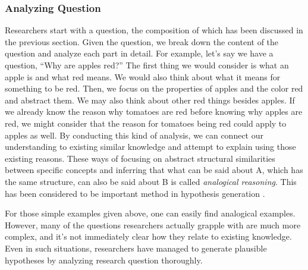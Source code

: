 
\subsubsection{Analyzing Question}
Researchers start with a question, the composition of which has been discussed in the previous section. Given the question, we break down the content of the question and analyze each part in detail. For example, let's say we have a question, ``Why are apples red?'' The first thing we would consider is what an apple is and what red means. We would also think about what it means for something to be red. Then, we focus on the properties of apples and the color red and abstract them. We may also think about other red things besides apples. If we already know the reason why tomatoes are red before knowing why apples are red, we might consider that the reason for tomatoes being red could apply to apples as well. By conducting this kind of analysis, we can connect our understanding to existing similar knowledge and attempt to explain using those existing reasons. These ways of focusing on abstract structural similarities between specific concepts and inferring that what can be said about A, which has the same structure, can also be said about B is called \textit{analogical reasoning}. This has been considered to be important method in hypothesis generation \cite{hesse1965models,thagard_1984,gentner1993shift,holyoak1996mental,dunbar1997scientists}.

For those simple examples given above, one can easily find analogical examples. However, many of the questions researchers actually grapple with are much more complex, and it's not immediately clear how they relate to existing knowledge. Even in such situations, researchers have managed to generate plausible hypotheses by analyzing research question thoroughly.

